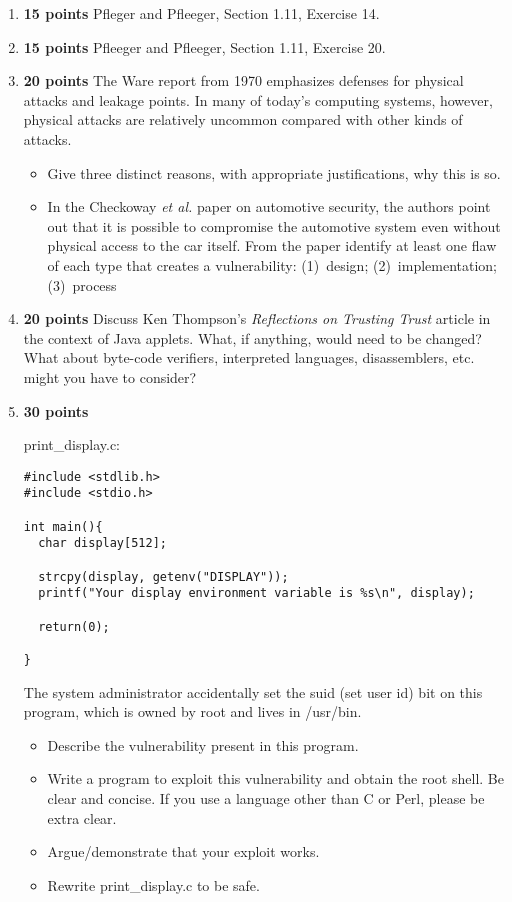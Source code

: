 \documentclass[11pt]{article}
\begin{document}
\begin{enumerate}
\item {\bf 15 points} Pfleger and Pfleeger, Section 1.11, Exercise 14.
\item {\bf 15 points} Pfleeger and Pfleeger, Section 1.11, Exercise 20.
\item {\bf 20 points} The Ware report from 1970 emphasizes defenses for
  physical attacks and leakage points. In many of today’s computing
  systems, however, physical attacks are relatively uncommon compared
  with other kinds of attacks.
  \begin{itemize}
    \item Give three distinct reasons, with appropriate justiﬁcations,
      why this is so. 
    \item In the Checkoway {\em et al.} paper on automotive security,
      the authors point out that it is possible to compromise the
      automotive system even without physical access to the car itself.
      From the paper identify at least one flaw of each type that
      creates a vulnerability: (1)~design; (2)~implementation; (3)~process
  \end{itemize}
\item {\bf 20 points} Discuss Ken Thompson's {\em Reflections on
  Trusting Trust} article in the context of Java applets.  What, if
  anything, would need to be changed?  What about byte-code verifiers,
  interpreted languages, disassemblers, etc. might you have to consider? 
\item {\bf 30 points} 

print\_display.c:

\begin{verbatim}
#include <stdlib.h>
#include <stdio.h>

int main(){
  char display[512];

  strcpy(display, getenv("DISPLAY"));
  printf("Your display environment variable is %s\n", display);

  return(0);

}
\end{verbatim}

The system administrator accidentally set the suid (set user id) bit on
this program, which is owned by root and lives in /usr/bin.

\begin{itemize}
\item Describe the vulnerability present in this program.
\item Write a program to exploit this vulnerability and obtain the root
  shell.  Be clear and concise.  If you use a language other than C or
  Perl, please be extra clear.
\item Argue/demonstrate that your exploit works.
\item Rewrite print\_display.c to be safe.
\end{itemize}

\end{enumerate}
\end{document}
